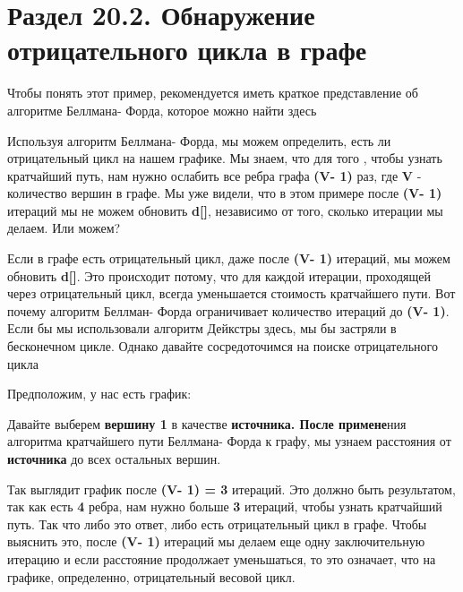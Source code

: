 
\section*{Раздел 20.2. Обнаружение отрицательного цикла в графе}

Чтобы понять этот пример, рекомендуется иметь краткое представление об алгоритме Беллмана- Форда, которое можно найти здесь

\vspace{\baselineskip}

Используя алгоритм Беллмана- Форда, мы можем определить, есть ли отрицательный цикл на нашем графике. Мы знаем, что для того , чтобы узнать кратчайший путь, нам нужно ослабить все ребра графа \textbf{(V- 1)} раз, где \textbf{V} -  количество вершин в графе. Мы уже видели, что в этом примере после \textbf{(V- 1)} итераций мы не можем обновить \textbf{d[]}, независимо от того, сколько итерации мы делаем. Или можем?

\vspace{\baselineskip}

Если в графе есть отрицательный цикл, даже после \textbf{(V- 1)} итераций, мы можем обновить \textbf{d[]}. Это происходит потому, что для каждой итерации, проходящей через отрицательный цикл, всегда уменьшается стоимость кратчайшего пути. Вот почему алгоритм Беллман- Форда ограничивает количество итераций до \textbf{(V- 1)}. Если бы мы использовали алгоритм Дейкстры здесь, мы бы застряли в бесконечном цикле. Однако давайте сосредоточимся на поиске отрицательного цикла

\vspace{\baselineskip}

Предположим, у нас есть график:


Давайте выберем \textbf{вершину 1} в качестве \textbf{источника. После примене}ния алгоритма кратчайшего пути Беллмана- Форда к графу, мы узнаем расстояния от \textbf{источника} до всех остальных вершин.


Так выглядит график после \textbf{(V- 1) = 3} итераций. Это должно быть результатом, так как есть \textbf{4} ребра, нам нужно больше \textbf{3} итераций, чтобы узнать кратчайший путь. Так что либо это ответ, либо есть отрицательный цикл в графе. Чтобы выяснить это, после \textbf{(V- 1)} итераций мы делаем еще одну заключительную итерацию и если расстояние продолжает уменьшаться, то это означает, что на графике, определенно, отрицательный весовой цикл.

